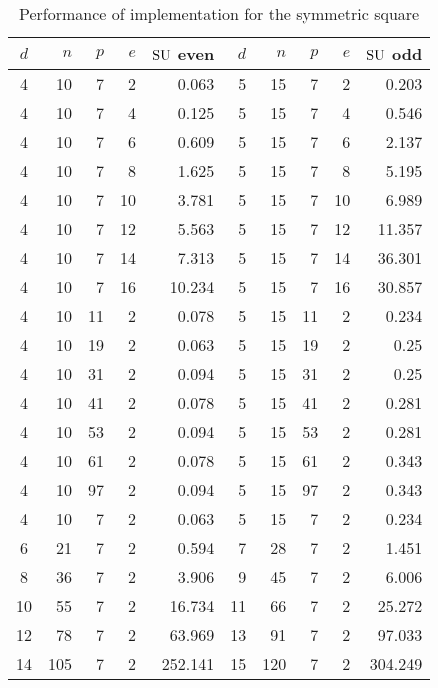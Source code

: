 \documentclass[12pt]{report}
\def\SU{{\rm SU}}
\begin{document}
\begin{table}[htp]																			
\label{timings}																			
\begin{center}																			
\begin{tabular}																			
{|c|r|r|r|r||r|r|r|r|r|} \hline																			
$d$	&	$n$	&	$p$ 	&	$e$ 	&	$\SU$ even	&	$d$	&	$n$	&	$p$ 	&	$e$ 	&	$\SU$ odd 	
\rule{0cm}{2.5ex}\\ \hline																			
4	&	10	&	7	&	2	&	0.063	&	5	&	15	&	7	&	2	&	0.203	\rule{0cm}{2.5ex}\\ \hline
4	&	10	&	7	&	4	&	0.125	&	5	&	15	&	7	&	4	&	0.546	\rule{0cm}{2.5ex}\\ \hline
4	&	10	&	7	&	6	&	0.609	&	5	&	15	&	7	&	6	&	2.137	\rule{0cm}{2.5ex}\\ \hline
4	&	10	&	7	&	8	&	1.625	&	5	&	15	&	7	&	8	&	5.195	\rule{0cm}{2.5ex}\\ \hline
4	&	10	&	7	&	10	&	3.781	&	5	&	15	&	7	&	10	&	6.989	\rule{0cm}{2.5ex}\\ \hline
4	&	10	&	7	&	12	&	5.563	&	5	&	15	&	7	&	12	&	11.357	\rule{0cm}{2.5ex}\\ \hline
4	&	10	&	7	&	14	&	7.313	&	5	&	15	&	7	&	14	&	36.301	\rule{0cm}{2.5ex}\\ \hline
4	&	10	&	7	&	16	&	10.234	&	5	&	15	&	7	&	16	&	30.857	\rule{0cm}{2.5ex}\\ \hline
4	&	10	&	11	&	2	&	0.078	&	5	&	15	&	11	&	2	&	0.234	\rule{0cm}{2.5ex}\\ \hline
4	&	10	&	19	&	2	&	0.063	&	5	&	15	&	19	&	2	&	0.25	\rule{0cm}{2.5ex}\\ \hline
4	&	10	&	31	&	2	&	0.094	&	5	&	15	&	31	&	2	&	0.25	\rule{0cm}{2.5ex}\\ \hline
4	&	10	&	41	&	2	&	0.078	&	5	&	15	&	41	&	2	&	0.281	\rule{0cm}{2.5ex}\\ \hline
4	&	10	&	53	&	2	&	0.094	&	5	&	15	&	53	&	2	&	0.281	\rule{0cm}{2.5ex}\\ \hline
4	&	10	&	61	&	2	&	0.078	&	5	&	15	&	61	&	2	&	0.343	\rule{0cm}{2.5ex}\\ \hline
4	&	10	&	97	&	2	&	0.094	&	5	&	15	&	97	&	2	&	0.343	\rule{0cm}{2.5ex}\\ \hline
4	&	10	&	7	&	2	&	0.063	&	5	&	15	&	7	&	2	&	0.234	\rule{0cm}{2.5ex}\\ \hline
6	&	21	&	7	&	2	&	0.594	&	7	&	28	&	7	&	2	&	1.451	\rule{0cm}{2.5ex}\\ \hline
8	&	36	&	7	&	2	&	3.906	&	9	&	45	&	7	&	2	&	6.006	\rule{0cm}{2.5ex}\\ \hline
10	&	55	&	7	&	2	&	16.734	&	11	&	66	&	7	&	2	&	25.272	\rule{0cm}{2.5ex}\\ \hline
12	&	78	&	7	&	2	&	63.969	&	13	&	91	&	7	&	2	&	97.033	\rule{0cm}{2.5ex}\\ \hline
14	&	105	&	7	&	2	&	252.141	&	15	&	120	&	7	&	2	&	304.249	\rule{0cm}{2.5ex}\\ \hline
\end{tabular}																			
\end{center}																			
\caption{Performance of implementation for the symmetric square}
\end{table}																			
\\																			
\newpage																			
																			
\end{document}
